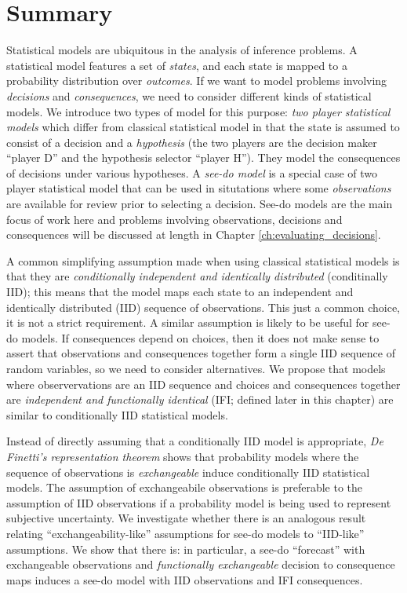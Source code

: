 


\section{Summary}

Statistical models are ubiquitous in the analysis of inference problems. A statistical model features a set of \emph{states}, and each state is mapped to a probability distribution over \emph{outcomes}. If we want to model problems involving \emph{decisions} and \emph{consequences}, we need to consider different kinds of statistical models. We introduce two types of model for this purpose: \emph{two player statistical models} which differ from classical statistical model in that the state is assumed to consist of a decision and a \emph{hypothesis} (the two players are the decision maker ``player D'' and the hypothesis selector ``player H''). They model the consequences of decisions under various hypotheses. A \emph{see-do model} is a special case of two player statistical model that can be used in situtations where some \emph{observations} are available for review prior to selecting a decision. See-do models are the main focus of work here and problems involving observations, decisions and consequences will be discussed at length in Chapter \ref{ch:evaluating_decisions}.

A common simplifying assumption made when using classical statistical models is that they are \emph{conditionally independent and identically distributed} (conditinally IID); this means that the model maps each state to an independent and identically distributed (IID) sequence of observations. This just a common choice, it is not a strict requirement. A similar assumption is likely to be useful for see-do models. If consequences depend on choices, then it does not make sense to assert that observations and consequences together form a single IID sequence of random variables, so we need to consider alternatives. We propose that models where observervations are an IID sequence and choices and consequences together are \emph{independent and functionally identical} (IFI; defined later in this chapter) are similar to conditionally IID statistical models. 

Instead of directly assuming that a conditionally IID model is appropriate, \emph{De Finetti's representation theorem} shows that probability models where the sequence of observations is \emph{exchangeable} induce conditionally IID statistical models. The assumption of exchangeabile observations is preferable to the assumption of IID observations if a probability model is being used to represent subjective uncertainty. We investigate whether there is an analogous result relating ``exchangeability-like'' assumptions for see-do models to ``IID-like'' assumptions. We show that there is: in particular, a see-do ``forecast'' with exchangeable observations and \emph{functionally exchangeable} decision to consequence maps induces a see-do model with IID observations and IFI consequences.

